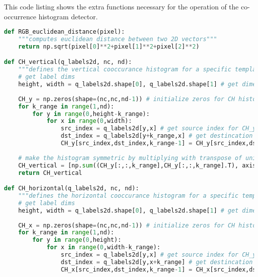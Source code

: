This code listing shows the extra functions necessary for the operation of the
co-occurrence histogram detector.
\begin{lstlisting}[language=Python, caption={Additional functions for Co-occurrence Histogram Detection}, captionpos=b, label={lst:supportCH}]
def RGB_euclidean_distance(pixel):
    """computes euclidean distance between two 2D vectors"""
    return np.sqrt(pixel[0]**2+pixel[1]**2+pixel[2]**2)

def CH_vertical(q_labels2d, nc, nd):
    """defines the vertical cooccurance histogram for a specific template according to quantized colourspace labels matrix and distances"""
    # get label dims
    height, width = q_labels2d.shape[0], q_labels2d.shape[1] # get dimensions
    
    CH_y = np.zeros(shape=(nc,nc,nd-1)) # initialize zeros for CH histogram according to quantizations size
    for k_range in range(1,nd):
        for y in range(0,height-k_range):
            for x in range(0,width):
                src_index = q_labels2d[y,x] # get source index for CH_y at (y,x)
                dst_index = q_labels2d[y+k_range,x] # get destincation index for CH_y at (y+k,x)
                CH_y[src_index,dst_index,k_range-1] = CH_y[src_index,dst_index,k_range-1] + 1 # update histogram count in bin (src_index,dst_index)
                
    # make the histogram symmetric by multiplying with transpose of unidirectional cooccurance histogram
    CH_vertical = [np.sum((CH_y[:,:,k_range],CH_y[:,:,k_range].T), axis=0) for k_range in range(0,nd-1)]
    return CH_vertical

def CH_horizontal(q_labels2d, nc, nd):
    """defines the horizontal cooccurance histogram for a specific template according to quantized colourspace labels matrix and distances"""
    # get label dims
    height, width = q_labels2d.shape[0], q_labels2d.shape[1] # get dimensions
    
    CH_x = np.zeros(shape=(nc,nc,nd-1)) # initialize zeros for CH histogram according to quantizations size
    for k_range in range(1,nd):
        for y in range(0,height):
            for x in range(0,width-k_range):
                src_index = q_labels2d[y,x] # get source index for CH_y at (y,x)
                dst_index = q_labels2d[y,x+k_range] # get destincation index for CH_y at (y+k,x)
                CH_x[src_index,dst_index,k_range-1] = CH_x[src_index,dst_index,k_range-1] + 1 # update histogram count in bin (src_index,dst_index)
    

\end{lstlisting}
